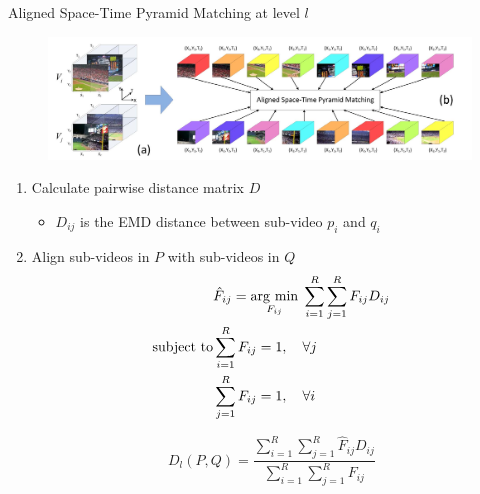 \begin{frame}{Aligned Space-Time Pyramid Matching \cite{duan2012visual} at level $l$}

	\begin{figure}[!ht]
	\centering
		\includegraphics[scale=0.2]{./alignedST.png}
	\end{figure}


		\begin{enumerate}
			\item Calculate pairwise distance matrix $D$
				\begin{itemize}
					\item $D_{ij}$ is the EMD distance between sub-video $p_i$ and $q_i$
				\end{itemize}

			\item Align sub-videos in $P$ with sub-videos in $Q$ 
				\begin{eqnarray}
				& \hat F_{ij} = \underset{F_{ij}}{\operatorname{arg}\,\operatorname{min}}\; \sum_{i = 1}^{R} \sum_{j=1}^{R} F_{ij} D_{ij}
				\nonumber \\
				\text{subject to} & \sum_{i=1}^{R} F_{ij} = 1, \quad \forall j \nonumber\\
				&\sum_{j=1}^{R} F_{ij} = 1, \quad \forall i
				\end{eqnarray}

				\begin{equation}
				D_l(P,Q) = \frac{\sum_{i=1}^R \sum_{j=1}^R \hat F_{ij} D_{ij}}{\sum_{i=1}^R \sum_{j=1}^R F_{ij}}
				\end{equation}
		\end{enumerate}


\end{frame}

